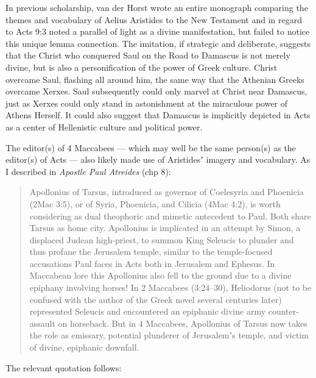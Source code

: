\noindent{}In previous scholarship, van der Horst wrote an entire monograph comparing the themes %
and vocabulary of Aelius Aristides to the New Testament %
and in regard to Acts 9:3 noted a parallel of light as a divine manifestation, %
but failed to notice this unique lemma connection. %
The imitation, if strategic and deliberate, %
suggests that the Christ who conquered Saul on the Road to Damascus %
is not merely divine, but is also a personification of the power of Greek culture. %
Christ overcame Saul, flashing all around him, %
the same way that the Athenian Greeks overcame Xerxes. %
Saul subsequently could only marvel at Christ near Damascus, %
just as Xerxes could only stand in astonishment at the miraculous power of Athens Herself. %
It could also suggest that Damascus is implicitly depicted in Acts %
as a center of Hellenistic culture and political power. %

The editor(s) of 4 Maccabees --- which may well be the same person(s) as the editor(s) of Acts ---
also likely made use of Aristidesʼ imagery and vocabulary. %
As I described in \textit{Apostle Paul Atreides} (chp 8): %

\vspace*{2mm} 
 \begin{quote}Apollonius of Tarsus, introduced as governor of Coelesyria and Phoenicia (2Mac 3:5), or of Syria, Phoenicia, and Cilicia (4Mac 4:2), is worth considering as dual theophoric and mimetic antecedent to Paul. Both share Tarsus as home city. Apollonius is implicated in an attempt by Simon, a displaced Judean high-priest, to summon King Seleucis to plunder and thus profane the Jerusalem temple, similar to the temple-focused accusations Paul faces in Acts both in Jerusalem and Ephesus. In Maccabean lore this Apollonius also fell to the ground due to a divine epiphany involving horses! %
 In 2 Maccabees (3:24--30), Heliodorus (not to be confused with the author of the Greek novel several centuries later) represented Seleucis and encountered an epiphanic divine army counter-assault on horseback. %
 But in 4 Maccabees, Apollonius of Tarsus now takes the role as emissary, %
 potential plunderer of Jerusalemʼs temple, and victim of divine, epiphanic downfall.
\end{quote} %
 \vspace*{2mm}

\noindent{}The relevant quotation follows: %

